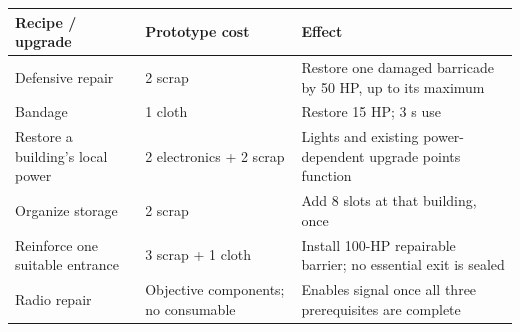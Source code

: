 \begin{longtable}{@{}p{}p{}p{}@{}}
\toprule
\textbf{Recipe / upgrade} & \textbf{Prototype cost} & \textbf{Effect} \\ \midrule\endhead
Defensive repair & 2 scrap & Restore one damaged barricade by 50 HP, up to its maximum \\
Bandage & 1 cloth & Restore 15 HP; 3 s use \\
Restore a building's local power & 2 electronics + 2 scrap & Lights and existing power-dependent upgrade points function \\
Organize storage & 2 scrap & Add 8 slots at that building, once \\
Reinforce one suitable entrance & 3 scrap + 1 cloth & Install 100-HP repairable barrier; no essential exit is sealed \\
Radio repair & Objective components; no consumable & Enables signal once all three prerequisites are complete \\
\bottomrule
\end{longtable}
